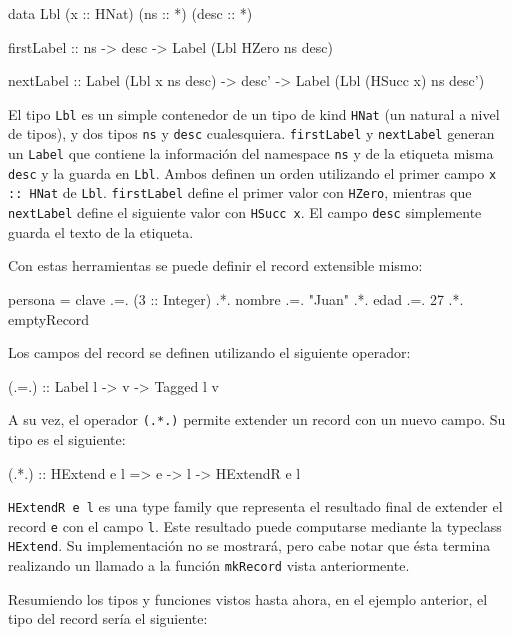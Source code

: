 \begin{code}
data Lbl (x :: HNat) (ns :: *) (desc :: *)

firstLabel :: ns -> desc -> Label (Lbl HZero ns desc)

nextLabel :: Label (Lbl x ns desc) -> desc' ->
  Label (Lbl (HSucc x) ns desc')
\end{code}

El tipo \texttt{Lbl} es un simple contenedor de un tipo de kind \texttt{HNat} (un natural a nivel de tipos), y dos tipos \texttt{ns} y \texttt{desc} cualesquiera. \texttt{firstLabel} y \texttt{nextLabel} generan un \texttt{Label} que contiene la información del namespace \texttt{ns} y de la etiqueta misma \texttt{desc} y la guarda en \texttt{Lbl}. Ambos definen un orden utilizando el primer campo \texttt{x :: HNat} de \texttt{Lbl}. \texttt{firstLabel} define el primer valor con \texttt{HZero}, mientras que \texttt{nextLabel} define el siguiente valor con \texttt{HSucc x}. El campo \texttt{desc} simplemente guarda el texto de la etiqueta.

Con estas herramientas se puede definir el record extensible mismo:

\begin{code}
persona = clave .=. (3 :: Integer)
  .*. nombre .=. "Juan"
  .*. edad .=. 27
  .*. emptyRecord
\end{code}

Los campos del record se definen utilizando el siguiente operador:

\begin{code}
(.=.) :: Label l -> v -> Tagged l v
\end{code}

A su vez, el operador \texttt{(.*.)} permite extender un record con un nuevo campo. Su tipo es el siguiente:

\begin{code}
(.*.) :: HExtend e l => e -> l -> HExtendR e l
\end{code}

\texttt{HExtendR e l} es una type family que representa el resultado final de extender el record \texttt{e} con el campo \texttt{l}. Este resultado puede computarse mediante la typeclass \texttt{HExtend}. Su implementación no se mostrará, pero cabe notar que ésta termina realizando un llamado a la función \texttt{mkRecord} vista anteriormente.

Resumiendo los tipos y funciones vistos hasta ahora, en el ejemplo anterior, el tipo del record sería el siguiente:

